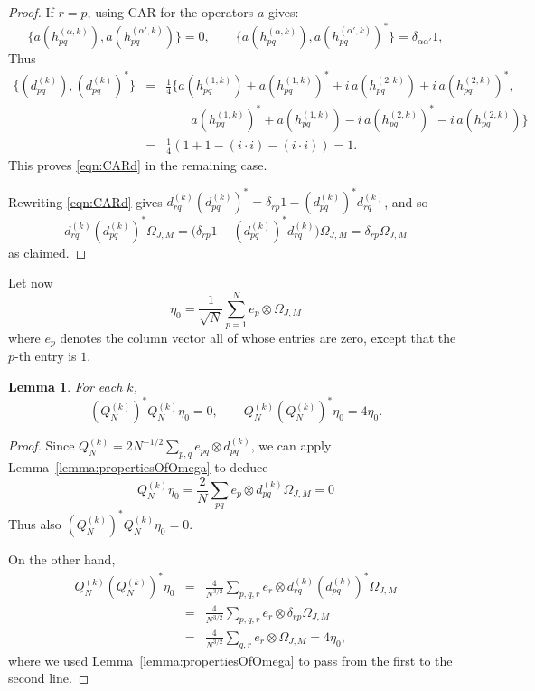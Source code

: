 \documentclass[10pt,a4paper]{amsart}
\newtheorem{lemma}{Lemma}
\begin{document}
\begin{proof}
If $r=p$, using CAR for the operators $a$ gives:
\[\{ a(h_{pq}^{(\alpha,k)}), a(h_{pq}^{(\alpha',k)})\} = 0,\qquad \{ a(h_{pq}^{(\alpha,k)}), a(h_{pq}^{(\alpha',k)})^*\} = \delta_{\alpha\alpha'}1,\]
Thus
\begin{eqnarray*}
    \{(d^{(k)}_{pq}), (d^{(k)}_{pq})^*\} & = & 
    \frac{1}{4}\{a(h^{(1,k)}_{pq}) +a(h^{(1,k)}_{pq})^*
+i\,a(h^{(2,k)}_{pq})
+i\,a(h^{(2,k)}_{pq})^*    
 , \\ && \qquad 
a(h^{(1,k)}_{pq})^*
+a(h^{(1,k)}_{pq})
-i\,a(h^{(2,k)}_{pq})^*
-i\,a(h^{(2,k)}_{pq})
\} \\ &= & \frac{1}{4}(1 + 1 - (i \cdot i) - (i\cdot i)) = 1.
\end{eqnarray*}
This proves \eqref{eqn:CARd} in the remaining case.  

Rewriting \eqref{eqn:CARd} gives $d^{(k)}_{rq}(d^{(k)}_{pq})^* = \delta_{rp}1 - (d^{(k)}_{pq})^* d^{(k)}_{rq}
$, and so 
 \[d^{(k)}_{rq}(d^{(k)}_{pq})^*\Omega_{J,M} = 
\bigl(\delta_{rp}1 - (d^{(k)}_{pq})^* d^{(k)}_{rq}\bigr)\Omega_{J,M} = \delta_{rp} \Omega_{J,M}\] as claimed. 
\end{proof}



Let now 
\[
\eta_0 = \frac{1}{\sqrt{N}} \sum_{p=1}^N e_p \otimes \Omega_{J,M}
\] where $e_p$ denotes the column vector all of whose entries are zero, except that the $p$-th entry is $1$. 

\begin{lemma} \label{lemma:QOnEta} For each $k$,
    \[(Q^{(k)}_N)^* Q^{(k)}_N\eta_0 = 0,  \qquad Q^{(k)}_N (Q^{(k)}_N)^* \eta_0 = 4 \eta_0.\]
\end{lemma}

\begin{proof}
    Since $Q^{(k)}_N = 2 N^{-1/2} \sum_{p,q} e_{pq}\otimes d_{pq}^{(k)}$, we can apply Lemma~\ref{lemma:propertiesOfOmega} to deduce
    \[Q_N^{(k)} \eta_0 = \frac{2}{N}\sum_{pq} e_{p}\otimes  d_{pq}^{(k)} \Omega_{J,M} = 0  \] Thus also \( (Q^{(k)}_N)^* Q^{(k)}_N\eta_0 = 0\).

    On the other hand,
    \begin{eqnarray*}
        Q^{(k)}_N (Q^{(k)}_N)^* \eta_0 &=& 
        \frac{4}{N^{3/2}}\sum_{p,q,r} e_{r} \otimes d_{rq}^{(k)} (d_{pq}^{(k)})^* \Omega_{J,M} \\
        &=& \frac{4}{N^{3/2}}\sum_{p,q,r} e_{r} \otimes \delta_{rp}  \Omega_{J,M}  \\
        &=& \frac{4}{N^{3/2}}\sum_{q,r} e_{r} \otimes \Omega_{J,M}  
        =4\eta_0,
    \end{eqnarray*} where we used Lemma~\ref{lemma:propertiesOfOmega} to pass from the first to the second line.
\end{proof}
\end{document}
